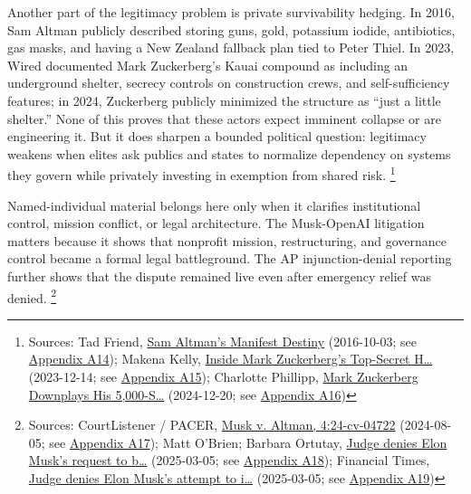 \documentclass[
  american,
  11pt,
  letterpaper,
]{article}
\begin{document}
Another part of the legitimacy problem is private survivability hedging.
In 2016, Sam Altman publicly described storing guns, gold, potassium
iodide, antibiotics, gas masks, and having a New Zealand fallback plan
tied to Peter Thiel. In 2023, Wired documented Mark Zuckerberg's Kauai
compound as including an underground shelter, secrecy controls on
construction crews, and self-sufficiency features; in 2024, Zuckerberg
publicly minimized the structure as ``just a little shelter.'' None of
this proves that these actors expect imminent collapse or are
engineering it. But it does sharpen a bounded political question:
legitimacy weakens when elites ask publics and states to normalize
dependency on systems they govern while privately investing in exemption
from shared risk. \footnote{Sources: Tad Friend,
  \href{https://www.newyorker.com/magazine/2016/10/10/sam-altmans-manifest-destiny}{Sam
  Altman's Manifest Destiny} (2016-10-03; see
  \hyperref[appendix-a14-sam-altman-s-manifest-destiny]{Appendix A14});
  Makena Kelly,
  \href{https://www.wired.com/story/mark-zuckerberg-inside-hawaii-compound}{Inside
  Mark Zuckerberg's Top-Secret H\ldots{}} (2023-12-14; see
  \hyperref[appendix-a15-inside-mark-zuckerbergs-top-secret-hawaii-compound]{Appendix
  A15}); Charlotte Phillipp,
  \href{https://people.com/mark-zuckerberg-hawaii-bunker-5000-square-feet-8765376}{Mark
  Zuckerberg Downplays His 5,000-S\ldots{}} (2024-12-20; see
  \hyperref[appendix-a16-mark-zuckerberg-downplays-his-5-000-square-foot-underground-bunker-in-hawaii-just-a-little-shelter]{Appendix
  A16})}

Named-individual material belongs here only when it clarifies
institutional control, mission conflict, or legal architecture. The
Musk-OpenAI litigation matters because it shows that nonprofit mission,
restructuring, and governance control became a formal legal
battleground. The AP injunction-denial reporting further shows that the
dispute remained live even after emergency relief was denied.
\footnote{Sources: CourtListener / PACER,
  \href{https://www.courtlistener.com/docket/69013420/musk-v-altman/}{Musk
  v. Altman, 4:24-cv-04722} (2024-08-05; see
  \hyperref[appendix-a17-musk-v-altman-4-24-cv-04722]{Appendix A17});
  Matt O'Brien; Barbara Ortutay,
  \href{https://apnews.com/article/elon-musk-openai-lawsuit-f5724e7ab07b5bed8292a1e8aa2ef695}{Judge
  denies Elon Musk's request to b\ldots{}} (2025-03-05; see
  \hyperref[appendix-a18-judge-denies-elon-musk-s-request-to-block-openai-for-profit-conversion-but-welcomes-trial]{Appendix
  A18}); Financial Times,
  \href{https://www.ft.com/content/532931dd-e1c0-4f18-a8af-5777dd70a52d}{Judge
  denies Elon Musk's attempt to i\ldots{}} (2025-03-05; see
  \hyperref[appendix-a19-judge-denies-elon-musks-attempt-to-immediately-block-openais-conversion-to-for-profit-entity]{Appendix
  A19})}
\end{document}
